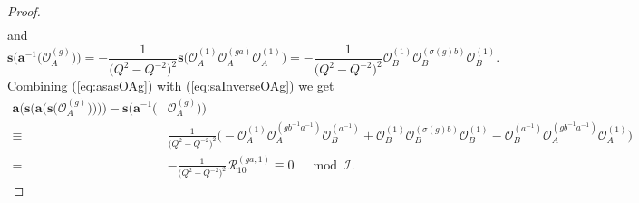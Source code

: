 \documentclass{amsart}
\newcommand{\Oa}{\mathcal O_A}
\newcommand{\Ob}{\mathcal O_B}
\newcommand{\R}{\mathcal R}
\begin{document}
\begin{proof}
\begin{equation}
\begin{aligned}
\end{aligned}
\label{eq:asasOAg}
\end{equation}
and
\begin{equation}
\mathbf s\big(\mathbf a^{-1}\big(\Oa^{(g)}\big)\big)=-\frac1{\big(Q^2-Q^{-2}\big)^2}\mathbf s\Big(\Oa^{(1)}\Oa^{(ga)}\Oa^{(1)}\Big)=-\frac1{\big(Q^2-Q^{-2}\big)^2}\Ob^{(1)}\Ob^{(\sigma(g)b)}\Ob^{(1)}.
\label{eq:saInverseOAg}
\end{equation}
Combining (\ref{eq:asasOAg}) with (\ref{eq:saInverseOAg}) we get
\begin{equation}
\begin{aligned}
\mathbf a\big(\mathbf s\big(\mathbf a\big(\mathbf s\big(\Oa^{(g)}\big)\big)\big)\big)-\mathbf s\big(\mathbf a^{-1}\big(&\Oa^{(g)}\big)\big)\\
\equiv& \frac1{\big(Q^2-Q^{-2}\big)^2}\Big(-\Oa^{(1)}\Oa^{(gb^{-1}a^{-1})}\Ob^{(a^{-1})}+\Ob^{(1)}\Ob^{(\sigma(g)b)}\Ob^{(1)}-\Ob^{(a^{-1})}\Oa^{(gb^{-1}a^{-1})}\Oa^{(1)}\Big)\\
=&- \frac1{\big(Q^2-Q^{-2}\big)^2}\R_{10}^{(ga,1)}\equiv 0\quad\bmod\mathcal I.
\label{eq:R10ToProveMCG}
\end{aligned}
\end{equation}


\end{proof}
\end{document}
